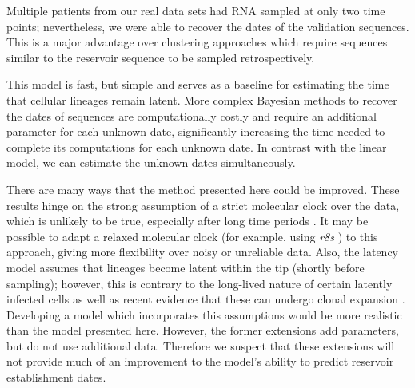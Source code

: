 \documentclass{bmcart}
\begin{document}

Multiple patients from our real data sets had RNA sampled at only two time points; nevertheless, we were able to recover the dates of the validation sequences.
This is a major advantage over clustering approaches \cite{Buzon14} which require sequences similar to the reservoir sequence to be sampled retrospectively.

This model is fast, but simple and serves as a baseline for estimating the time that cellular lineages remain latent.
More complex Bayesian methods \cite{Shapiro11} to recover the dates of sequences are computationally costly and require an additional parameter for each unknown date, significantly increasing the time needed to complete its computations for each unknown date.
In contrast with the linear model, we can estimate the unknown dates simultaneously.

There are many ways that the method presented here could be improved.
These results hinge on the strong assumption of a strict molecular clock over the data, which is unlikely to be true, especially after long time periods \cite{Shankarappa99}. 
It may be possible to adapt a relaxed molecular clock (for example, using \textit{r8s} \cite{r8ts}) to this approach, giving more flexibility over noisy or unreliable data.
Also, the latency model assumes that lineages become latent within the tip (shortly before sampling); however, this is contrary to the long-lived nature of certain latently infected cells as well as recent evidence that these can undergo clonal expansion \cite{Maldarelli14}.
Developing a model which incorporates this assumptions
would be more realistic than the model presented here.
However, the former extensions add parameters, but do not use additional data.
Therefore we suspect that these extensions will not provide much of an improvement to the model's ability to predict reservoir establishment dates.
\end{document}
